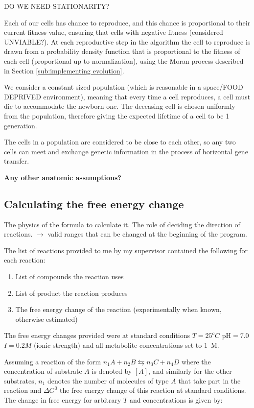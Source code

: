 \documentclass[10pt,a4paper]{article}
\begin{document}
	DO WE NEED STATIONARITY?

	Each of our cells has chance to reproduce, and this chance is proportional to their current fitness value, ensuring that cells with negative fitness (considered UNVIABLE?). At each reproductive step in the algorithm the cell to reproduce is drawn from a probability density function that is proportional to the fitness of each cell (proportional up to normalization), using the Moran process described in Section \ref{sub:implementing evolution}.


	We consider a constant sized population (which is reasonable in a space/FOOD DEPRIVED environment), meaning that every time a cell reproduces, a cell must die to accommodate the newborn one. The deceasing cell is chosen uniformly from the population, therefore giving the expected lifetime of a cell to be 1 generation.

	The cells in a population are considered to be close to each other, so  any two cells can meet and exchange genetic information in the process of horizontal gene transfer.

	\textbf{Any other anatomic assumptions?}

\subsection{Calculating the free energy change}
\label{sub:The free energy change}
The physics of the formula to calculate it. The role of deciding the direction of reactions.  $\rightarrow$ valid ranges  that can be changed at the beginning of the program.



	The list of reactions provided to me by my supervisor contained the following for each reaction: 
	\begin{enumerate}
		\item List of compounds the reaction uses
		\item List of product the reaction produces
		\item The free energy change of the reaction (experimentally when known, otherwise estimated) \cite{BartekLower}
	\end{enumerate}
	
	The free energy changes provided were at standard conditions $T=25  ^o C$ pH$=7.0$ $I=0.2 M$ (ionic strength) and all metabolite concentrations set to 1~M.
	
	Assuming a reaction of the form $n_1A + n_2B \leftrightarrows n_3C + n_4D$ where the concentration of substrate $A$ is denoted by $[A]$, and similarly for the other substrates, $n_1$ denotes the number of molecules of type $A$ that take part in the reaction and  $\Delta G^0$  the free energy change of this reaction at standard conditions. The change in free energy for arbitrary $T$ and concentrations is given by: 
	
\end{document}

